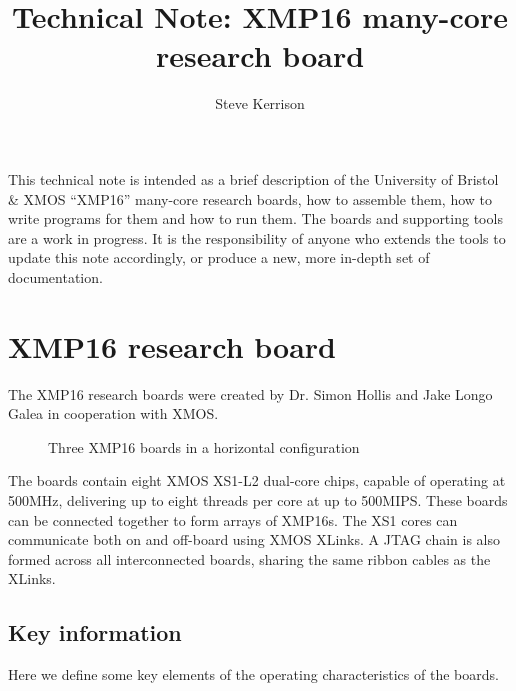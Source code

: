 \documentclass[12pt,a4paper,final,twoside]{article}
\begin{document}
\title{Technical Note: XMP16 many-core research board}
\author{Steve Kerrison}
\maketitle

This technical note is intended as a brief description of the University of Bristol \& XMOS ``XMP16'' many-core research boards, how to assemble them, how to write programs for them and how to run them. The boards and supporting tools are a work in progress. It is the responsibility of anyone who extends the tools to update this note accordingly, or produce a new, more in-depth set of documentation.

\section{XMP16 research board}

The XMP16 research boards were created by Dr. Simon Hollis and Jake Longo Galea in cooperation with XMOS.

\begin{figure}[htbp]
\centering
\setlength\fboxsep{0pt}
\setlength\fboxrule{1pt}
\caption{Three XMP16 boards in a horizontal configuration}
\end{figure}

The boards contain eight XMOS XS1-L2 dual-core chips, capable of operating at 500MHz, delivering up to eight threads per core at up to 500MIPS. These boards can be connected together to form arrays of XMP16s. The XS1 cores can communicate both on and off-board using XMOS XLinks. A JTAG chain is also formed across all interconnected boards, sharing the same ribbon cables as the XLinks.

\subsection{Key information}

Here we define some key elements of the operating characteristics of the boards.
\end{document}
